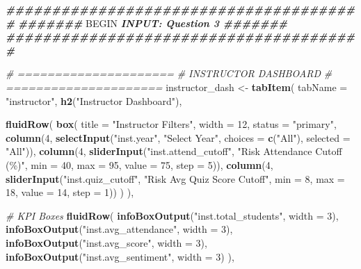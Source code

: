 \documentclass[
]{article}
\newenvironment{Shaded}{\begin{snugshade}}{\end{snugshade}}
\newcommand{\AttributeTok}[1]{\textcolor[rgb]{0.13,0.29,0.53}{#1}}
\newcommand{\CommentTok}[1]{\textcolor[rgb]{0.56,0.35,0.01}{\textit{#1}}}
\newcommand{\DecValTok}[1]{\textcolor[rgb]{0.00,0.00,0.81}{#1}}
\newcommand{\DocumentationTok}[1]{\textcolor[rgb]{0.56,0.35,0.01}{\textbf{\textit{#1}}}}
\newcommand{\FunctionTok}[1]{\textcolor[rgb]{0.13,0.29,0.53}{\textbf{#1}}}
\newcommand{\NormalTok}[1]{#1}
\newcommand{\OtherTok}[1]{\textcolor[rgb]{0.56,0.35,0.01}{#1}}
\newcommand{\RegionMarkerTok}[1]{#1}
\newcommand{\StringTok}[1]{\textcolor[rgb]{0.31,0.60,0.02}{#1}}
\begin{document}
\begin{Shaded}
\begin{Highlighting}[]
\DocumentationTok{\#\#\#\#\#\#\#\#\#\#\#\#\#\#\#\#\#\#\#\#\#\#\#\#\#\#\#\#\#\#\#\#\#\#\#\#\#\#\#}
\DocumentationTok{\#\#\#\#\#\#\# }\RegionMarkerTok{BEGIN}\DocumentationTok{ INPUT: Question 3 \#\#\#\#\#\#\#}
\DocumentationTok{\#\#\#\#\#\#\#\#\#\#\#\#\#\#\#\#\#\#\#\#\#\#\#\#\#\#\#\#\#\#\#\#\#\#\#\#\#\#\#}

\CommentTok{\# =====================}
\CommentTok{\# INSTRUCTOR DASHBOARD}
\CommentTok{\# =====================}
\NormalTok{instructor\_dash }\OtherTok{\textless{}{-}} \FunctionTok{tabItem}\NormalTok{(}
  \AttributeTok{tabName =} \StringTok{"instructor"}\NormalTok{,}
  \FunctionTok{h2}\NormalTok{(}\StringTok{"Instructor Dashboard"}\NormalTok{),}
  
  \FunctionTok{fluidRow}\NormalTok{(}
    \FunctionTok{box}\NormalTok{(}
      \AttributeTok{title =} \StringTok{"Instructor Filters"}\NormalTok{, }\AttributeTok{width =} \DecValTok{12}\NormalTok{, }\AttributeTok{status =} \StringTok{"primary"}\NormalTok{,}
      \FunctionTok{column}\NormalTok{(}\DecValTok{4}\NormalTok{, }\FunctionTok{selectInput}\NormalTok{(}\StringTok{"inst.year"}\NormalTok{, }\StringTok{"Select Year"}\NormalTok{, }\AttributeTok{choices =} \FunctionTok{c}\NormalTok{(}\StringTok{"All"}\NormalTok{), }\AttributeTok{selected =} \StringTok{"All"}\NormalTok{)),}
      \FunctionTok{column}\NormalTok{(}\DecValTok{4}\NormalTok{, }\FunctionTok{sliderInput}\NormalTok{(}\StringTok{"inst.attend\_cutoff"}\NormalTok{, }\StringTok{"Risk Attendance Cutoff (\%)"}\NormalTok{, }\AttributeTok{min =} \DecValTok{40}\NormalTok{, }\AttributeTok{max =} \DecValTok{95}\NormalTok{, }\AttributeTok{value =} \DecValTok{75}\NormalTok{, }\AttributeTok{step =} \DecValTok{5}\NormalTok{)),}
      \FunctionTok{column}\NormalTok{(}\DecValTok{4}\NormalTok{, }\FunctionTok{sliderInput}\NormalTok{(}\StringTok{"inst.quiz\_cutoff"}\NormalTok{, }\StringTok{"Risk Avg Quiz Score Cutoff"}\NormalTok{, }\AttributeTok{min =} \DecValTok{8}\NormalTok{, }\AttributeTok{max =} \DecValTok{18}\NormalTok{, }\AttributeTok{value =} \DecValTok{14}\NormalTok{, }\AttributeTok{step =} \DecValTok{1}\NormalTok{))}
\NormalTok{    )}
\NormalTok{  ),}
  
  \CommentTok{\# KPI Boxes}
  \FunctionTok{fluidRow}\NormalTok{(}
    \FunctionTok{infoBoxOutput}\NormalTok{(}\StringTok{"inst.total\_students"}\NormalTok{, }\AttributeTok{width =} \DecValTok{3}\NormalTok{),}
    \FunctionTok{infoBoxOutput}\NormalTok{(}\StringTok{"inst.avg\_attendance"}\NormalTok{, }\AttributeTok{width =} \DecValTok{3}\NormalTok{),}
    \FunctionTok{infoBoxOutput}\NormalTok{(}\StringTok{"inst.avg\_score"}\NormalTok{, }\AttributeTok{width =} \DecValTok{3}\NormalTok{),}
    \FunctionTok{infoBoxOutput}\NormalTok{(}\StringTok{"inst.avg\_sentiment"}\NormalTok{, }\AttributeTok{width =} \DecValTok{3}\NormalTok{)}
\NormalTok{  ),}
  

\end{Highlighting}
\end{Shaded}
\end{document}
